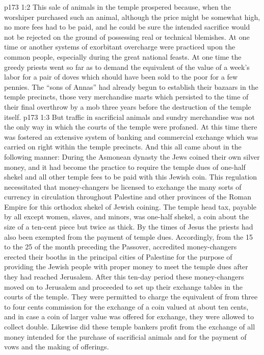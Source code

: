 \vs p173 1:2 This sale of animals in the temple prospered because, when the worshiper purchased such an animal, although the price might be somewhat high, no more fees had to be paid, and he could be sure the intended sacrifice would not be rejected on the ground of possessing real or technical blemishes. At one time or another systems of exorbitant overcharge were practiced upon the common people, especially during the great national feasts. At one time the greedy priests went so far as to demand the equivalent of the value of a week’s labor for a pair of doves which should have been sold to the poor for a few pennies. The “sons of Annas” had already begun to establish their bazaars in the temple precincts, those very merchandise marts which persisted to the time of their final overthrow by a mob three years before the destruction of the temple itself.
\vs p173 1:3 \pc But traffic in sacrificial animals and sundry merchandise was not the only way in which the courts of the temple were profaned. At this time there was fostered an extensive system of banking and commercial exchange which was carried on right within the temple precincts. And this all came about in the following manner: During the Asmonean dynasty the Jews coined their own silver money, and it had become the practice to require the temple dues of one\hyp{}half shekel and all other temple fees to be paid with this Jewish coin. This regulation necessitated that money\hyp{}changers be licensed to exchange the many sorts of currency in circulation throughout Palestine and other provinces of the Roman Empire for this orthodox shekel of Jewish coining. The temple head tax, payable by all except women, slaves, and minors, was one\hyp{}half shekel, a coin about the size of a ten\hyp{}cent piece but twice as thick. By the times of Jesus the priests had also been exempted from the payment of temple dues. Accordingly, from the 15 to the 25 of the month preceding the Passover, accredited money\hyp{}changers erected their booths in the principal cities of Palestine for the purpose of providing the Jewish people with proper money to meet the temple dues after they had reached Jerusalem. After this ten\hyp{}day period these money\hyp{}changers moved on to Jerusalem and proceeded to set up their exchange tables in the courts of the temple. They were permitted to charge the equivalent of from three to four cents commission for the exchange of a coin valued at about ten cents, and in case a coin of larger value was offered for exchange, they were allowed to collect double. Likewise did these temple bankers profit from the exchange of all money intended for the purchase of sacrificial animals and for the payment of vows and the making of offerings.
